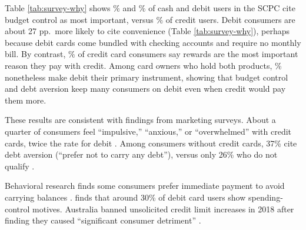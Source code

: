 \documentclass[main.tex]{subfiles}
\begin{document}
Table \ref{tab:survey-why} shows $\%$ and $\%$ of cash and debit users in the SCPC cite budget control as most important, versus $\%$ of credit users.
Debit consumers are about 27 pp.\ more likely to cite convenience (Table \ref{tab:survey-why}), perhaps because debit cards come bundled with checking accounts and require no monthly bill.
By contrast, $\%$ of credit card consumers say rewards are the most important reason they pay with credit.
Among card owners who hold both products, \% nonetheless make debit their primary instrument, showing that budget control and debt aversion keep many consumers on debit even when credit would pay them more.

These results are consistent with findings from marketing surveys.
About a quarter of consumers feel ``impulsive,'' ``anxious,'' or ``overwhelmed'' with credit cards, twice the rate for debit \parencite{Issa2017}.
Among consumers without credit cards, 37\% cite debt aversion (``prefer not to carry any debt''), versus only 26\% who do not qualify \parencite{Boehm2018}.

Behavioral research finds some consumers prefer immediate payment to avoid carrying balances \parencite{Prelec.Loewenstein1998}.
\textcite{Zinman2004} finds that around 30\% of debit card users show spending-control motives.
Australia banned unsolicited credit limit increases in 2018 after finding they caused ``significant consumer detriment'' \parencite{RetailBankerInternational2018}.
\end{document}
